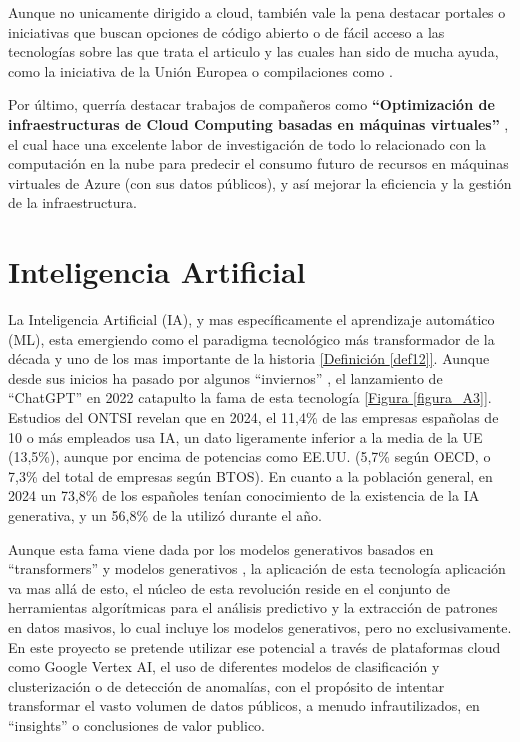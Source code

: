 Aunque no unicamente dirigido a cloud, también vale la pena destacar portales o iniciativas que buscan opciones de código abierto o de fácil acceso a las tecnologías sobre las que trata el articulo y las cuales han sido de mucha ayuda, como la iniciativa de la Unión Europea \citep{EuropeanAlternatives} o compilaciones como \citep{free-for-dev}.

Por último, querría destacar trabajos de compañeros como \textbf{``Optimización de infraestructuras de Cloud Computing basadas en máquinas virtuales''} \citep{sanchez2023optimizacion}, el cual hace una excelente labor de investigación de todo lo relacionado con la computación en la nube para predecir el consumo futuro de recursos en máquinas virtuales de Azure (con sus datos públicos), y así mejorar la eficiencia y la gestión de la infraestructura. \newpage


\newpage


\section{Inteligencia Artificial}
\label{sec:EstudiosIA}

La Inteligencia Artificial (IA), y mas específicamente el aprendizaje automático (ML), esta emergiendo como el paradigma tecnológico más transformador de la década y uno de los mas importante de la historia \hyperref[def12]{[Definición \ref*{def12}]}. Aunque desde sus inicios ha pasado por algunos ``inviernos'' \citep{Cheok2023AIHistory}, el lanzamiento de ``ChatGPT'' en 2022 catapulto la fama de esta tecnología \hyperref[figura_A3]{[Figura \ref*{figura_A3}]}. Estudios del ONTSI \citep{ontsi2025indicadores} revelan que en 2024, el 11,4\% de las empresas españolas de 10 o más empleados usa IA, un dato ligeramente inferior a la media de la UE (13,5\%), aunque por encima de potencias como EE.UU. (5,7\% según OECD, o 7,3\% del total de empresas según BTOS). En cuanto a la población general, en 2024 un 73,8\% de los españoles tenían conocimiento de la existencia de la IA generativa, y un 56,8\% de la utilizó durante el año.

Aunque esta fama viene dada por los modelos generativos basados en ``transformers'' y modelos generativos  \citep{vaswani2017attention}, la aplicación de esta tecnología aplicación va mas allá de esto, el núcleo de esta revolución reside en  el conjunto de herramientas algorítmicas para el análisis predictivo y la extracción de patrones en datos masivos, lo cual incluye los modelos generativos, pero no exclusivamente. En este proyecto se pretende utilizar ese potencial a través de plataformas cloud como Google Vertex AI, el uso de diferentes modelos de clasificación y clusterización o de detección de anomalías, con el propósito de intentar transformar el vasto volumen de datos públicos, a menudo infrautilizados, en ``insights'' o conclusiones de valor publico.

